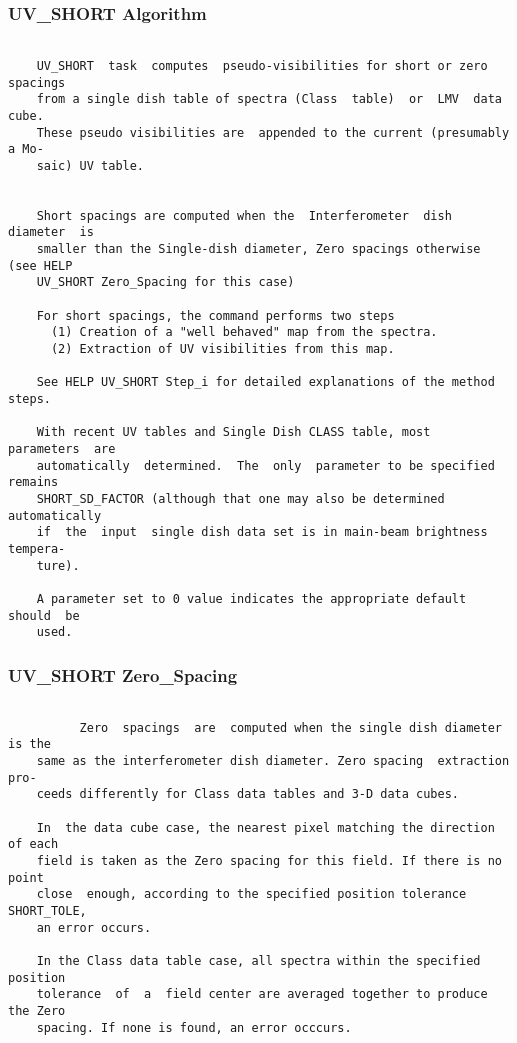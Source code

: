 \subsubsection{UV\_SHORT Algorithm}
\begin{verbatim}

    UV_SHORT  task  computes  pseudo-visibilities for short or zero spacings
    from a single dish table of spectra (Class  table)  or  LMV  data  cube.
    These pseudo visibilities are  appended to the current (presumably a Mo-
    saic) UV table.


    Short spacings are computed when the  Interferometer  dish  diameter  is
    smaller than the Single-dish diameter, Zero spacings otherwise (see HELP
    UV_SHORT Zero_Spacing for this case)

    For short spacings, the command performs two steps
      (1) Creation of a "well behaved" map from the spectra.
      (2) Extraction of UV visibilities from this map.

    See HELP UV_SHORT Step_i for detailed explanations of the method steps.

    With recent UV tables and Single Dish CLASS table, most  parameters  are
    automatically  determined.  The  only  parameter to be specified remains
    SHORT_SD_FACTOR (although that one may also be determined  automatically
    if  the  input  single dish data set is in main-beam brightness tempera-
    ture).

    A parameter set to 0 value indicates the appropriate default  should  be
    used.

\end{verbatim}
\subsubsection{UV\_SHORT Zero\_Spacing}
\begin{verbatim}

          Zero  spacings  are  computed when the single dish diameter is the
    same as the interferometer dish diameter. Zero spacing  extraction  pro-
    ceeds differently for Class data tables and 3-D data cubes.

    In  the data cube case, the nearest pixel matching the direction of each
    field is taken as the Zero spacing for this field. If there is no  point
    close  enough, according to the specified position tolerance SHORT_TOLE,
    an error occurs.

    In the Class data table case, all spectra within the specified  position
    tolerance  of  a  field center are averaged together to produce the Zero
    spacing. If none is found, an error occcurs.


\end{verbatim}

